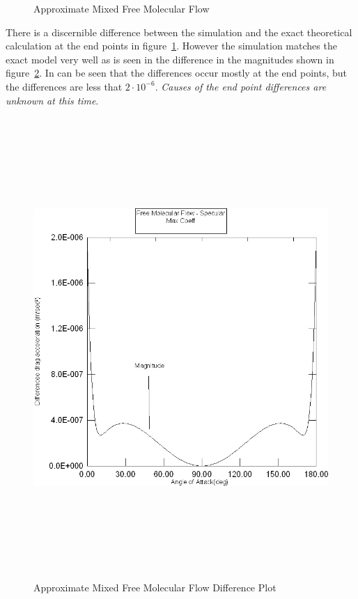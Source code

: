 \begin{description}
\begin{figure}[hbpt]
\caption{Approximate Mixed Free Molecular Flow}
\label{fig:3}
\end{figure}
There is a discernible difference between the simulation and the exact
theoretical calculation at the end points in figure~\ref{fig:3}.  However
the simulation matches the exact model very well as is seen in the
difference in the magnitudes shown in figure~\ref{fig:4}. In can be seen
that the differences occur mostly at the end points, but the differences
are less that $2 \cdot 10^{-6}$.  {\em Causes of the end point differences
are unknown at this time}.
\begin{figure}[hbpt]
\includegraphics [height=175mm]{figs/mixed_err.jpg}
\caption{Approximate Mixed Free Molecular Flow Difference Plot}
\label{fig:4}
\end{figure}
\end{description}
\newpage

